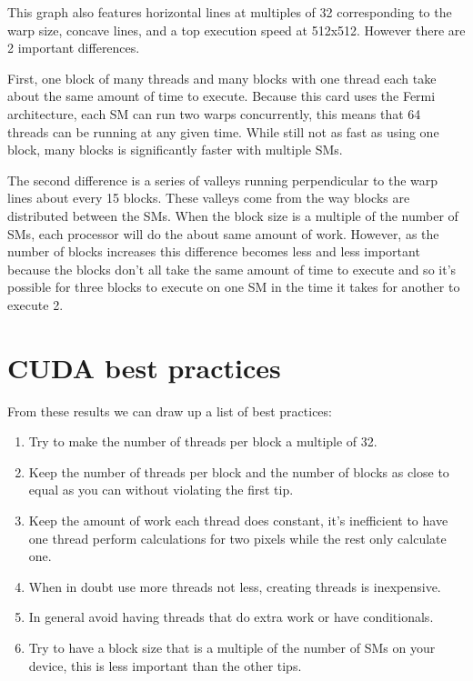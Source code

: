 \documentclass[letterpaper,10pt,openany,oneside]{sphinxmanual}
\begin{document}
This graph also features horizontal lines at multiples of
32 corresponding to the warp size, concave lines, and a top
execution speed at 512x512. However there are 2 important
differences.

First, one block of many threads and many blocks with one
thread each take about the same amount of time to execute.
Because this card uses the Fermi architecture, each SM can run
two warps concurrently, this means that 64 threads can be running
at any given time. While still not as fast as using one block,
many blocks is significantly faster with multiple SMs.

The second difference is a series of valleys running
perpendicular to the warp lines about every 15 blocks.
These valleys come from the way blocks are distributed
between the SMs. When the block size is a multiple of the
number of SMs, each processor will do the about same
amount of work. However, as the number of blocks increases
this difference becomes less and less important because
the blocks don't all take the same amount of time to execute
and so it's possible for three blocks to execute on one SM
in the time it takes for another to execute 2.


\section{CUDA best practices}
\label{2-Findings/Findings:cuda-best-practices}
From these results we can draw up a list of best practices:
\begin{enumerate}
\item {} 
Try to make the number of threads per block a multiple of 32.

\item {} 
Keep the number of threads per block and the number of blocks as close to equal as you can without violating the first tip.

\item {} 
Keep the amount of work each thread does constant, it's inefficient to have one thread perform calculations for two pixels while the rest only calculate one.

\item {} 
When in doubt use more threads not less, creating threads is inexpensive.

\item {} 
In general avoid having threads that do extra work or have conditionals.

\item {} 
Try to have a block size that is a multiple of the number of SMs on your device, this is less important than the other tips.

\end{enumerate}



\renewcommand{\indexname}{Index}
\printindex
\end{document}

